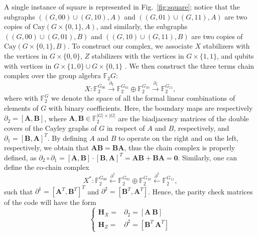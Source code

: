 \documentclass[a4paper,twocolumn,11pt,accepted=2026-05-03]{quantumarticle}
\begin{document}
A single instance of square is represented in Fig.~\ref{fig:square}; notice that the subgraphs 
$((G,00)\cup (G,10),A)$
and 
$((G,01)\cup (G,11),A)$
are two copies of $\mathrm{Cay}(G\times \{0,1\},A)$, and similarly, the subgraphs 
$((G,00)\cup (G,01),B)$
and 
$((G,10)\cup (G,11),B)$
are two copies of $\mathrm{Cay}(G\times \{0,1\},B)$. 
To construct our complex, we associate $X$ stabilizers with the vertices in $G\times \{0,0\}$, $Z$ stabilizers with the vertices in $G\times \{1,1\}$, and qubits with vertices in 
$G\times \{1,0\} \cup G\times \{0,1\}$
\cite{quantum_margulis_allerton}. 
We then construct the three terms chain complex over the group algebra $\mathbb{F}_2G$:
\begin{equation}
        X : \mathbb{F}_2^{G_{00}} \xrightarrow{\partial_2} \mathbb{F}_2^{G_{01}} \oplus \mathbb{F}_2^{G_{10}} \xrightarrow{\partial_1}  \mathbb{F}_2^{G_{11}},
\end{equation}
where with $\mathbb{F}_2^G$ we denote the space of all the formal linear combinations of elements of $G$ with binary coefficients.
Here, the boundary maps are respectively $\partial_2=[\mathbf{A},\mathbf{B}]$, where $\mathbf{A},\mathbf{B} \in \mathbb{F}_2^{|G|\times |G|}$ are the biadjacency matrices of the double covers of the Cayley graphs of $G$ in respect of $A$ and $B$, respectively, and $\partial_1 = [\mathbf{B},\mathbf{A}]^T$.
By defining $A$ and $B$ to operate on the right and on the left, respectively, we obtain that $\mathbf{A}\mathbf{B} = \mathbf{B} \mathbf{A}$, thus the chain complex is properly defined, as $\partial_2 \circ \partial_1 = [\mathbf{A},\mathbf{B}]\cdot [\mathbf{B},\mathbf{A}]^T=\mathbf{A}\mathbf{B}+\mathbf{B}\mathbf{A}=\mathbf{0}$. Similarly, one can define the co-chain complex
\begin{equation}
            X^* : \mathbb{F}_2^{G_{00}} \xleftarrow{\partial^1} \mathbb{F}_2^{G_{01}} \oplus \mathbb{F}_2^{G_{10}} \xleftarrow{\partial^2}  \mathbb{F}_2^{G_{11}}, 
\end{equation}
such that $\partial^1 = [\mathbf{A}^T,\mathbf{B}^T]^T$ and $\partial^2 = [\mathbf{B}^T,\mathbf{A}^T]$. Hence, the parity check matrices of the code will have the form
\begin{equation}
\label{eq:matrices}
\begin{cases}
    \mathbf{H}_X = & \partial_2 = [\mathbf{A}\ \mathbf{B}] \\ 
    \mathbf{H}_Z = & \partial^2 = [\mathbf{B}^T\ \mathbf{A}^T] 
\end{cases}
\end{equation}
\end{document}
